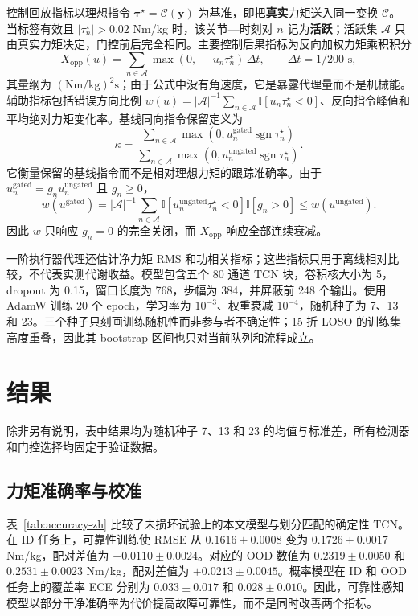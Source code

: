 \documentclass[UTF8]{ctexart}
\begin{document}
控制回放指标以理想指令 $\boldsymbol{\tau}^{\star}=\mathcal{C}(\mathbf{y})$ 为基准，即把\textbf{真实}力矩送入同一变换 $\mathcal{C}$。当标签有效且 $|\tau^{\star}_n|>0.02$ Nm/kg 时，该关节—时刻对 $n$ 记为\textbf{活跃}；活跃集 $\mathcal{A}$ 只由真实力矩决定，门控前后完全相同。主要控制后果指标为反向加权力矩乘积积分
\begin{equation}
X_{\mathrm{opp}}(u) = \textstyle\sum_{n\in\mathcal{A}} \max(0,\,-u_n\tau^{\star}_n)\,\Delta t,
\qquad \Delta t = 1/200\text{ s},
\end{equation}
其量纲为 $(\mathrm{Nm/kg})^2\mathrm{s}$；由于公式中没有角速度，它是暴露代理量而不是机械能。辅助指标包括错误方向比例
$w(u)=|\mathcal A|^{-1}\sum_{n\in\mathcal A}\mathbb I[u_n\tau_n^\star<0]$、反向指令峰值和平均绝对力矩变化率。基线同向指令保留定义为
\[
\kappa=\frac{\sum_{n\in\mathcal A}\max(0,u_n^{\mathrm{gated}}\operatorname{sgn}\tau_n^\star)}
{\sum_{n\in\mathcal A}\max(0,u_n^{\mathrm{ungated}}\operatorname{sgn}\tau_n^\star)} .
\]
它衡量保留的基线指令而不是相对理想力矩的跟踪准确率。由于
$u_n^{\mathrm{gated}}=g_nu_n^{\mathrm{ungated}}$ 且 $g_n\geq0$，
\[
w(u^{\mathrm{gated}})=|\mathcal A|^{-1}\sum_{n\in\mathcal A}
\mathbb I[u_n^{\mathrm{ungated}}\tau_n^\star<0]\mathbb I[g_n>0]
\leq w(u^{\mathrm{ungated}}).
\]
因此 $w$ 只响应 $g_n=0$ 的完全关闭，而 $X_{\mathrm{opp}}$ 响应全部连续衰减。

一阶执行器代理还估计净力矩 RMS 和功相关指标；这些指标只用于离线相对比较，不代表实测代谢收益。模型包含五个 80 通道 TCN 块，卷积核大小为 5，dropout 为 0.15，窗口长度为 768，步幅为 384，并屏蔽前 248 个输出。使用 AdamW 训练 20 个 epoch，学习率为 $10^{-3}$、权重衰减 $10^{-4}$，随机种子为 7、13 和 23。三个种子只刻画训练随机性而非参与者不确定性；15 折 LOSO 的训练集高度重叠，因此其 bootstrap 区间也只对当前队列和流程成立。

\section{结果}

除非另有说明，表中结果均为随机种子 7、13 和 23 的均值与标准差，所有检测器和门控选择均固定于验证数据。

\subsection{力矩准确率与校准}

表~\ref{tab:accuracy-zh} 比较了未损坏试验上的本文模型与划分匹配的确定性 TCN。在 ID 任务上，可靠性训练使 RMSE 从 $0.1616\pm0.0008$ 变为 $0.1726\pm0.0017$ Nm/kg，配对差值为 $+0.0110\pm0.0024$。对应的 OOD 数值为 $0.2319\pm0.0050$ 和 $0.2531\pm0.0023$ Nm/kg，配对差值为 $+0.0213\pm0.0045$。概率模型在 ID 和 OOD 任务上的覆盖率 ECE 分别为 $0.033\pm0.017$ 和 $0.028\pm0.010$。因此，可靠性感知模型以部分干净准确率为代价提高故障可靠性，而不是同时改善两个指标。
\end{document}
